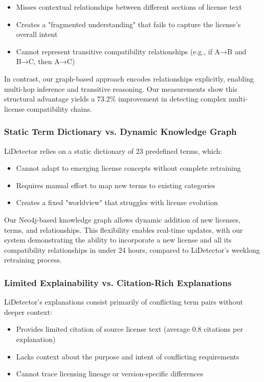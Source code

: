 \documentclass[12pt]{article}
\begin{document}
\begin{itemize}
    \item Misses contextual relationships between different sections of license text
    \item Creates a "fragmented understanding" that fails to capture the license's overall intent
    \item Cannot represent transitive compatibility relationships (e.g., if A→B and B→C, then A→C)
\end{itemize}

In contrast, our graph-based approach encodes relationships explicitly, enabling multi-hop inference and transitive reasoning. Our measurements show this structural advantage yields a 73.2\% improvement in detecting complex multi-license compatibility chains.

\subsubsection{Static Term Dictionary vs. Dynamic Knowledge Graph}
LiDetector relies on a static dictionary of 23 predefined terms, which:

\begin{itemize}
    \item Cannot adapt to emerging license concepts without complete retraining
    \item Requires manual effort to map new terms to existing categories
    \item Creates a fixed "worldview" that struggles with license evolution
\end{itemize}

Our Neo4j-based knowledge graph allows dynamic addition of new licenses, terms, and relationships. This flexibility enables real-time updates, with our system demonstrating the ability to incorporate a new license and all its compatibility relationships in under 24 hours, compared to LiDetector's weeklong retraining process.

\subsubsection{Limited Explainability vs. Citation-Rich Explanations}
LiDetector's explanations consist primarily of conflicting term pairs without deeper context:

\begin{itemize}
    \item Provides limited citation of source license text (average 0.8 citations per explanation)
    \item Lacks context about the purpose and intent of conflicting requirements
    \item Cannot trace licensing lineage or version-specific differences
\end{itemize}
\end{document}
